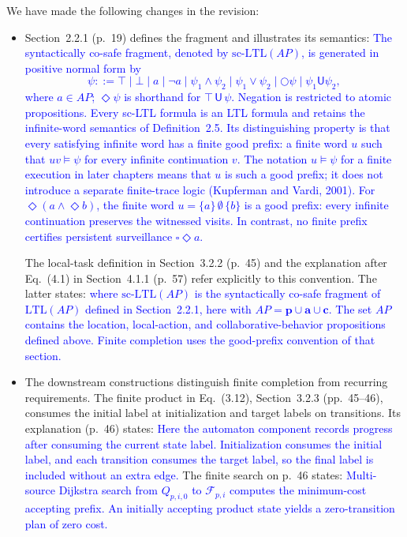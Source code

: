 \documentclass[11pt]{article}
\newcommand{\change}[1]{\textcolor{blue}{#1}}
\begin{document}
We have made the following changes in the revision:
\begin{itemize}
\item Section~2.2.1 (p.~19) defines the fragment and illustrates its semantics:
\change{The syntactically co-safe fragment, denoted by $\mathrm{sc\mbox{-}LTL}(AP)$,
is generated in positive normal form by
\[
\psi ::= \top\mid\bot\mid a\mid\neg a
\mid\psi_1\wedge\psi_2\mid\psi_1\vee\psi_2
\mid\bigcirc\psi\mid\psi_1\mathsf{U}\psi_2,
\]
where $a\in AP$; $\Diamond\psi$ is shorthand for
$\top\,\mathsf{U}\,\psi$. Negation is restricted to atomic propositions.
Every sc-LTL formula is an LTL formula and retains the infinite-word
semantics of Definition~2.5.
Its distinguishing property is that every satisfying infinite word has a
finite good prefix: a finite word $u$ such that $uv\models\psi$ for
every infinite continuation $v$. The notation $u\models\psi$ for a finite
execution in later chapters means that $u$ is such a good prefix; it does
not introduce a separate finite-trace logic (Kupferman and Vardi, 2001).
For $\Diamond(a\wedge\Diamond b)$, the finite word
$u=\{a\}\,\emptyset\,\{b\}$ is a good prefix: every infinite continuation
preserves the witnessed visits. In contrast, no finite prefix certifies
persistent surveillance $\square\Diamond a$.}

The local-task definition in Section~3.2.2 (p.~45) and the explanation after
Eq.~(4.1) in Section~4.1.1 (p.~57) refer explicitly to this convention.
The latter states:
\change{where $\mathrm{sc\mbox{-}LTL}(AP)$ is the syntactically co-safe fragment
of $\mathrm{LTL}(AP)$ defined in Section~2.2.1,
here with $AP=\mathbf{p}\cup\mathbf{a}\cup\mathbf{c}$.
The set $AP$ contains the location, local-action, and collaborative-behavior
propositions defined above.
Finite completion uses the good-prefix convention of that section.}

\item The downstream constructions distinguish finite completion from recurring
requirements. The finite product in Eq.~(3.12), Section~3.2.3 (pp.~45--46),
consumes the initial label at initialization and target labels on transitions.
Its explanation (p.~46) states:
\change{Here the automaton component records progress after consuming the current
state label. Initialization consumes the initial label, and each transition
consumes the target label, so the final label is included without an extra edge.}
The finite search on p.~46 states:
\change{Multi-source Dijkstra search from $Q_{p,i,0}$ to $\mathcal{F}_{p,i}$ computes
the minimum-cost accepting prefix.}
\change{An initially accepting product state yields a zero-transition plan of zero cost.}


\end{itemize}
\end{document}

